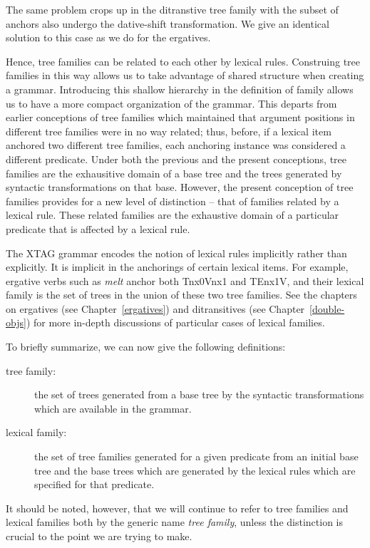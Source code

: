The same problem crops up in the ditranstive tree family with the subset of
anchors also undergo the dative-shift transformation. We give an identical
solution to this case as we do for the ergatives.

Hence, tree families can be related to each other by lexical rules.
Construing tree families in this way allows us to take advantage of
shared structure when creating a grammar. Introducing this shallow
hierarchy in the definition of family allows us to have a more compact
organization of the grammar. This departs from earlier conceptions of
tree families which maintained that argument positions in different
tree families were in no way related; thus, before, if a lexical item
anchored two different tree families, each anchoring instance was
considered a different predicate.  Under both the previous and the
present conceptions, tree families are the exhausitive domain of a
base tree and the trees generated by syntactic transformations on that
base.  However, the present conception of tree families provides for a
new level of distinction -- that of families related by a lexical
rule. These related families are the exhaustive domain of a particular
predicate that is affected by a lexical rule.

The XTAG grammar encodes the notion of lexical rules implicitly rather
than explicitly. It is implicit in the anchorings of certain lexical
items.  For example, ergative verbs such as {\it melt} anchor both
Tnx0Vnx1 and TEnx1V, and their lexical family is the set of trees in
the union of these two tree families.  See the chapters on ergatives
(see Chapter~\ref{ergatives}) and ditransitives (see
Chapter~\ref{double-objs}) for more in-depth discussions of particular
cases of lexical families.

To briefly summarize, we can now give the following definitions:

\begin{description}
\item[tree family:] the set of trees generated from a base tree by the
syntactic transformations which are available in the grammar.

\item[lexical family:] the set of tree families generated for a given
predicate from an initial base tree and the base trees which are
generated by the lexical rules which are specified for that predicate.

\end{description}

It should be noted, however, that we will continue to refer to tree families
and lexical families both by the generic name {\it tree family}, unless the
distinction is crucial to the point we are trying to make.
